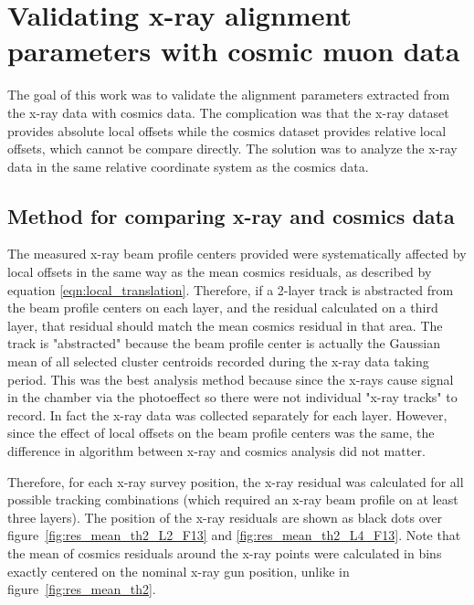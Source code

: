 
\chapter{Validating x-ray alignment parameters with cosmic muon data}
\label{chap:comparison}

The goal of this work was to validate the alignment parameters extracted from the x-ray data with cosmics data. The complication was that the x-ray dataset provides absolute local offsets while the cosmics dataset provides relative local offsets, which cannot be compare directly. The solution was to analyze the x-ray data in the same relative coordinate system as the cosmics data.

\section{Method for comparing x-ray and cosmics data}

The measured x-ray beam profile centers provided were systematically affected by local offsets in the same way as the mean cosmics residuals, as described by equation \ref{eqn:local_translation}. Therefore, if a 2-layer track is abstracted from the beam profile centers on each layer, and the residual calculated on a third layer, that residual should match the mean cosmics residual in that area. The track is "abstracted" because the beam profile center is actually the Gaussian mean of all selected cluster centroids recorded during the x-ray data taking period. This was the best analysis method because since the x-rays cause signal in the chamber via the photoeffect so there were not individual "x-ray tracks" to record. In fact the x-ray data was collected separately for each layer. However, since the effect of local offsets on the beam profile centers was the same, the difference in algorithm between x-ray and cosmics analysis did not matter. 

Therefore, for each x-ray survey position, the x-ray residual was calculated for all possible tracking combinations (which required an x-ray beam profile on at least three layers). The position of the x-ray residuals are shown as black dots over figure~\ref{fig:res_mean_th2_L2_F13} and \ref{fig:res_mean_th2_L4_F13}. Note that the mean of cosmics residuals around the x-ray points were calculated in bins exactly centered on the nominal x-ray gun position, unlike in figure~\ref{fig:res_mean_th2}.

